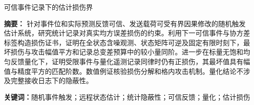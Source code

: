 \documentclass[UTF8,fontset=windows,zihao=5]{ctexart}
\begin{document}
\begin{center}
{\heiti{}可信事件记录下的估计损伤界\par}
\end{center}

\noindent\textbf{摘\quad 要：}
针对事件位和实际预测反馈可信、发送载荷可受有界因果修改的随机触发估计系统，研究统计记录对真实均方误差损伤的约束。利用下一可信事件与协方差标签构造损伤证书，证明在全状态含噪观测、状态矩阵可逆及固定有限时刻下，最坏损伤与攻击幅值平方和记录总变差预算中的较小量同阶。进一步在标量无饱和均匀反馈量化下，证明受限事件与量化遥测记录同律时仍有正损伤，其最坏值具有幅值与精度平方的匹配阶数。数值例证核验损伤分解和格内攻击机制。量化结论不涉及完整接收日志下的隐蔽性。

\smallskip
\noindent\textbf{关键词：}随机事件触发；远程状态估计；统计隐蔽性；可信反馈；量化；估计损伤







\appendix




\end{document}
